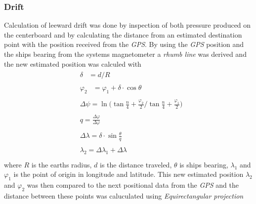 \subsubsection{Drift}
Calculation of leeward drift was done by inspection of both pressure produced on the centerboard and by calculating the distance from an estimated destination point with the position received from the \textit{GPS}. By using the \textit{GPS} position and the ships bearing from the systems magnetometer a \textit{rhumb line}\cite{rhumb-line} was derived and the new estimated position was calculed with
\begin{align*}
  &\begin{aligned}
  \delta &= d/R 
  \end{aligned}\\
 &\begin{aligned}
  \varphi_2 &= \varphi_1 + \delta \cdot \cos{\theta}
  \end{aligned}\\
 &\begin{aligned}
  \Delta\psi = \ln { \bigg( \tan{\frac{n}{4} + \frac{\varphi_2}{2}} \bigg/ \tan{\frac{n}{4} + \frac{\varphi_1}{2}} \bigg)}
  \end{aligned}\\
 &\begin{aligned}
  q = \frac{\Delta\varphi}{\Delta\varphi}
  \end{aligned}\\
 &\begin{aligned}
  \Delta\lambda = \delta\cdot\sin\frac{\theta}{q}
  \end{aligned}\\
 &\begin{aligned}
  \lambda_2 = \Delta\lambda_1 + \Delta\lambda
  \end{aligned}\\
\end{align*}
where $R$ is the earths radius, $d$ is the distance traveled, $\theta$ is ships bearing, $\lambda_1$ and $\varphi_1$ is the point of origin in longitude and latitude. This new estimated position $\lambda_2$ and $\varphi_2$ was then compared to the next positional data from the \textit{GPS} and the distance between these points was caluculated using \textit{Equirectangular projection}\cite{equitriangular}
